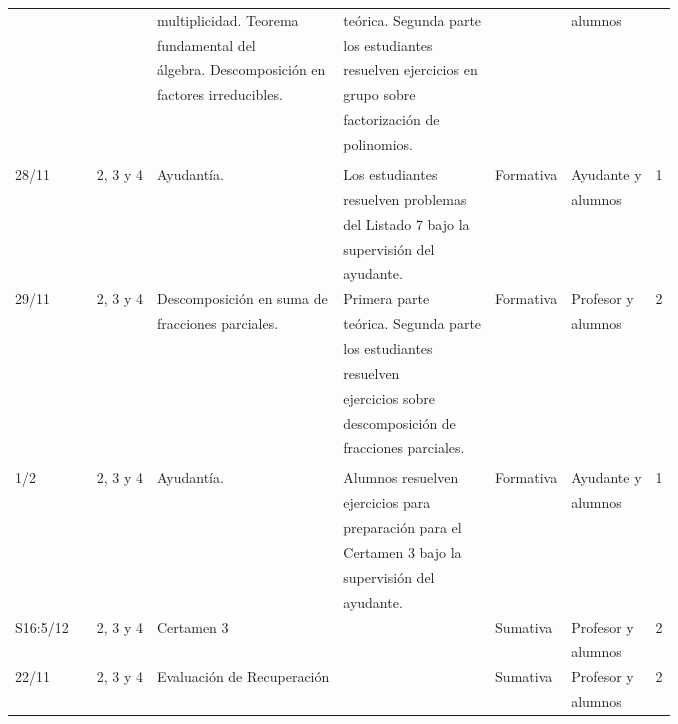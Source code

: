 \documentclass[11pt]{article}
\begin{document}
{\begin{center}
\begin{longtable}{|l|l|l|l|l|l|l|l|}
 & & & multiplicidad. Teorema & teórica. Segunda parte & & alumnos & \\
 & & & fundamental del & los estudiantes & & & \\
 & & & álgebra. Descomposición en & resuelven ejercicios en & & & \\
 & & & factores irreducibles. & grupo sobre & & & \\
 & & & & factorización de & & & \\
 & & & & polinomios. & & & \\
 & & & & & & & \\
\hline
28/11 & & 2, 3 y 4 & Ayudantía. & Los estudiantes & Formativa & Ayudante y & 1 \\
 & & & & resuelven problemas & & alumnos & \\
 & & & & del Listado 7 bajo la & & & \\
 & & & & supervisión del & & & \\
 & & & & ayudante. & & & \\
\hline
29/11 & & 2, 3 y 4 & Descomposición en suma de & Primera parte & Formativa & Profesor y & 2 \\
 & & & fracciones parciales. & teórica. Segunda parte & & alumnos & \\
 & & & & los estudiantes & & & \\
 & & & & resuelven & & & \\
 & & & & ejercicios sobre & & & \\
 & & & & descomposición de & & & \\
 & & & & fracciones parciales. & & & \\
 & & & & & & & \\
\hline
1/2 & & 2, 3 y 4 & Ayudantía. & Alumnos resuelven & Formativa & Ayudante y & 1 \\
 & & & & ejercicios para & & alumnos & \\
 & & & & preparación para el & & & \\
 & & & & Certamen 3 bajo la & & & \\
 & & & & supervisión del & & & \\
 & & & & ayudante. & & & \\
\hline
S16:5/12 & & 2, 3 y 4 & Certamen 3 & & Sumativa & Profesor y & 2 \\
 & & & & & & alumnos & \\
\hline
22/11 & & 2, 3 y 4 & Evaluación de Recuperación & & Sumativa & Profesor y & 2 \\
 & & & & & & alumnos & \\
\hline
\end{longtable}
\end{center}


}
\end{document}
